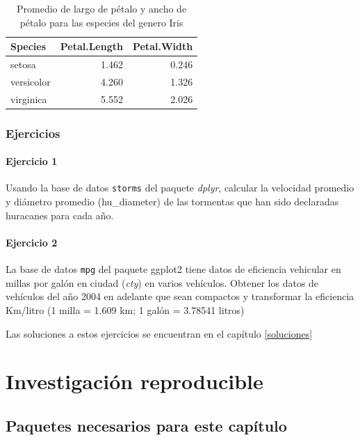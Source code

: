 \documentclass[]{book}
\begin{document}
\begin{table}

\caption{\label{tab:Selected}Promedio de largo de pétalo y ancho de pétalo para las especies del genero Iris}
\centering
\begin{tabular}[t]{lrr}
\toprule
Species & Petal.Length & Petal.Width\\
\midrule
setosa & 1.462 & 0.246\\
versicolor & 4.260 & 1.326\\
virginica & 5.552 & 2.026\\
\bottomrule
\end{tabular}
\end{table}

\hypertarget{ejercicios}{%
\subsection{Ejercicios}\label{ejercicios}}

\hypertarget{ejercicio-1}{%
\subsubsection{Ejercicio 1}\label{ejercicio-1}}

Usando la base de datos \texttt{storms} del paquete \emph{dplyr},
calcular la velocidad promedio y diámetro promedio (hu\_diameter) de las
tormentas que han sido declaradas huracanes para cada año.

\hypertarget{ejercicio-2}{%
\subsubsection{Ejercicio 2}\label{ejercicio-2}}

La base de datos \texttt{mpg} del paquete ggplot2 tiene datos de
eficiencia vehicular en millas por galón en ciudad (\emph{cty}) en
varios vehículos. Obtener los datos de vehículos del año 2004 en
adelante que sean compactos y transformar la eficiencia Km/litro (1
milla = 1.609 km; 1 galón = 3.78541 litros)

Las soluciones a estos ejercicios se encuentran en el capítulo
\ref{soluciones}

\hypertarget{reproducible}{%
\chapter{Investigación reproducible}\label{reproducible}}

\hypertarget{paquetes-necesarios-para-este-capitulo-1}{%
\section{Paquetes necesarios para este
capítulo}\label{paquetes-necesarios-para-este-capitulo-1}}
\end{document}

